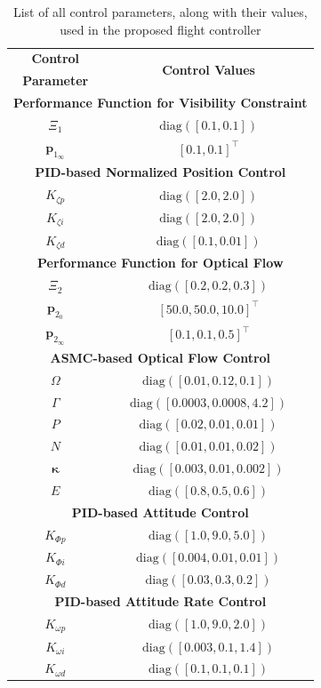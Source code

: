 \documentclass[lettersize,journal]{IEEEtran}
\begin{document}
\begin{table}
    \centering
    \begin{tabular}{|c|c|}
    \hline
        \textbf{Control} & \multirow{2}{*}{\textbf{Control Values}}\\
         \textbf{Parameter} & \\ \hline
         \multicolumn{2}{|c|}{\textbf{Performance Function for Visibility Constraint}} \\ \hline
         $\Xi_1$ & $\text{diag}([0.1, 0.1])$\\
         $\boldsymbol{p}_{1_\infty}$ & $[0.1, 0.1]^\top$ \\ [0.3em] \hline 
         \multicolumn{2}{|c|}{\textbf{PID-based Normalized Position Control}} \\ \hline
         $K_{\zeta p}$ & $\text{diag}([2.0, 2.0])$ \\
         $K_{\zeta i}$ & $\text{diag}([2.0, 2.0])$ \\
         $K_{\zeta d}$ & $\text{diag}([0.1, 0.01])$ \\ [0.3em] \hline 
         \multicolumn{2}{|c|}{\textbf{Performance Function for Optical Flow}} \\ \hline
         $\Xi_2$ & $\text{diag}([0.2, 0.2, 0.3])$ \\
         $\boldsymbol{p}_{2_0}$ & $[50.0, 50.0, 10.0]^\top$ \\
         $\boldsymbol{p}_{2_\infty}$ & $[0.1, 0.1, 0.5]^\top$ \\ [0.3em] \hline
         \multicolumn{2}{|c|}{\textbf{ASMC-based Optical Flow Control}} \\ \hline
         $\Omega$ & $\text{diag}([0.01, 0.12, 0.1])$ \\
         $\Gamma$ & $\text{diag}([0.0003, 0.0008, 4.2])$ \\
         $P$ & $\text{diag}([0.02, 0.01, 0.01])$ \\ 
         $N$ & $\text{diag}([0.01, 0.01, 0.02])$ \\ 
         $\boldsymbol{\kappa}$ & $\text{diag}([0.003, 0.01, 0.002])$ \\
         $E$ & $\text{diag}([0.8, 0.5, 0.6])$ \\ [0.3em] \hline
         \multicolumn{2}{|c|}{\textbf{PID-based Attitude Control}} \\ \hline
         $K_{\Phi p}$ & $\text{diag}([1.0, 9.0, 5.0])$ \\
         $K_{\Phi i}$ & $\text{diag}([0.004, 0.01, 0.01])$ \\
         $K_{\Phi d}$ & $\text{diag}([0.03, 0.3, 0.2])$ \\ [0.3em] \hline
         \multicolumn{2}{|c|}{\textbf{PID-based Attitude Rate Control}} \\ \hline
         $K_{\omega p}$ & $\text{diag}([1.0, 9.0, 2.0])$ \\
         $K_{\omega i}$ & $\text{diag}([0.003, 0.1, 1.4])$ \\
         $K_{\omega d}$ & $\text{diag}([0.1, 0.1, 0.1])$ \\ \hline
    \end{tabular}
    \caption{List of all control parameters, along with their values, used in the proposed flight controller}
    \label{control params: table}
\end{table}
\end{document}
